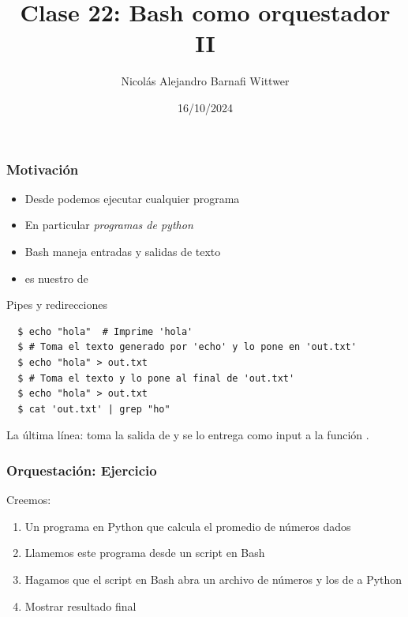 \documentclass[14pt,aspectratio=169,xcolor=dvipsnames]{beamer}
\title[short title]{Clase 22: Bash como orquestador II}
\subtitle{}
\author[NA Barnafi] {Nicolás Alejandro Barnafi Wittwer}
\institute[UC|CMM] 
{
    Pontificia Universidad Católica de Chile \\
    Centro de Modelamiento Matemático
}
\date{16/10/2024}
\begin{document}
\begin{frame}
    \maketitle
\end{frame}
\begin{frame}\frametitle{Motivación}
    \begin{itemize}
        \item Desde  podemos ejecutar cualquier programa
        \item En particular \emph{programas de python}
        \item Bash maneja entradas y salidas de texto
        \item {} es nuestro  de 
    \end{itemize}
\end{frame}
\begin{frame}[fragile]{Pipes y redirecciones}
    \begin{small}
    \begin{verbatim}
  $ echo "hola"  # Imprime 'hola'
  $ # Toma el texto generado por 'echo' y lo pone en 'out.txt'
  $ echo "hola" > out.txt 
  $ # Toma el texto y lo pone al final de 'out.txt'
  $ echo "hola" > out.txt 
  $ cat 'out.txt' | grep "ho"
    \end{verbatim} 
    \end{small}
La última línea: toma la salida de  y se lo entrega como input a la función .

\end{frame}
\begin{frame}[fragile]\frametitle{Orquestación: Ejercicio}
    Creemos: 
    \begin{enumerate}
        \item Un programa en Python que calcula el promedio de números dados
        \item Llamemos este programa desde un script en Bash
        \item Hagamos que el script en Bash abra un archivo de números y los de a Python
        \item Mostrar resultado final
    \end{enumerate}
\end{frame}
\end{document}
